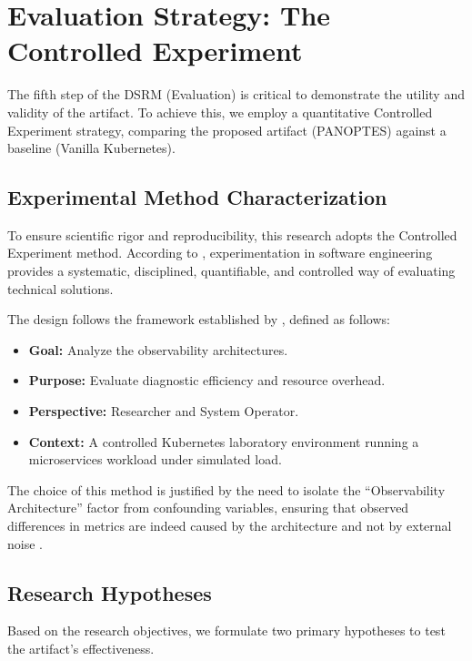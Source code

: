 \section{Evaluation Strategy: The Controlled Experiment}
\label{sec:evaluation}

The fifth step of the DSRM (Evaluation) is critical to demonstrate the utility and validity of the artifact. To achieve this, we employ a quantitative Controlled Experiment strategy, comparing the proposed artifact (PANOPTES) against a baseline (Vanilla Kubernetes).

\subsection{Experimental Method Characterization}
\label{sec:method-characterization}

To ensure scientific rigor and reproducibility, this research adopts the Controlled Experiment method. According to , experimentation in software engineering provides a systematic, disciplined, quantifiable, and controlled way of evaluating technical solutions. 

The design follows the framework established by , defined as follows:
\begin{itemize}
    \item \textbf{Goal:} Analyze the observability architectures.
    \item \textbf{Purpose:} Evaluate diagnostic efficiency and resource overhead.
    \item \textbf{Perspective:} Researcher and System Operator.
    \item \textbf{Context:} A controlled Kubernetes laboratory environment running a microservices workload under simulated load.
\end{itemize}

The choice of this method is justified by the need to isolate the ``Observability Architecture'' factor from confounding variables, ensuring that observed differences in metrics are indeed caused by the architecture and not by external noise \cite{wohlin_2012}.

\subsection{Research Hypotheses}
\label{sec:hypotheses}

Based on the research objectives, we formulate two primary hypotheses to test the artifact's effectiveness.

